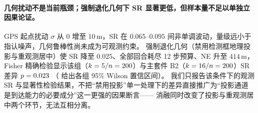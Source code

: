 \paragraph{几何扰动不是当前瓶颈；强制退化几何下 SR 显著更低，但样本量不足以单独立因果论证。}
GPS 起点扰动 $\sigma$ 从 0 增至 $10\,\mathrm{m}$，SR 在 $0.065$--$0.095$ 间非单调波动，量级远小于指认噪声，几何鲁棒性尚未成为可观测约束。
强制退化几何（禁用检测框地理投影与重观测居中）使 SR 降至 $0.025$、全部回合耗尽 12 步预算、NE 升至 $414\,\mathrm{m}$，
Fisher 精确检验显示该组（$k=5{}/n=200{}$）与主套件 B2（$k=16{}/n=200{}$）SR 差异 $p=0.023{}$
（ 给出各组 95\% Wilson 置信区间）。
我们只报告该条件下的观测 SR 与显著性检验结果，不把``禁用投影''单一处理下的差异直接推广为``投影通道是到达能力的必要成分''这一更强的因果断言——
消融同时改变了投影与重观测居中两个环节，无法互相分离。

\begin{table}[htbp]
\centering
\small
\setlength{\tabcolsep}{3pt}
\caption{Oracle 阶梯：导航与指认逐层替换为 oracle 后的到达能力（旧观测模型，事件隔离基准，$n=200$）。}
\label{tab:oracle}
\resizebox{\linewidth}{!}{}
\end{table}

\begin{table}[htbp]
\centering
\small
\setlength{\tabcolsep}{3pt}
\caption{端到端主消融与扰动套件（旧观测模型，事件隔离基准）。\SR 附 Wilson 95\% 置信区间。
固定下降策略触发次数远小于回合数，因为触发仍受上游``存在损伤证据''门控。}
\label{tab:e2e}
\resizebox{\linewidth}{!}{}
\end{table}
